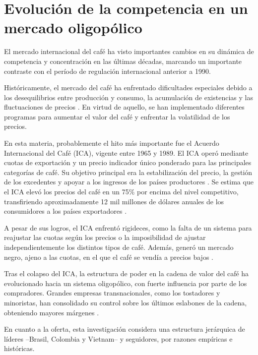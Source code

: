 \section{Evolución de la competencia en un mercado oligopólico}

El mercado internacional del café ha visto importantes cambios en su dinámica de competencia y concentración en las últimas décadas, marcando un importante contraste con el período de regulación internacional anterior a 1990.

Históricamente, el mercado del café ha enfrentado dificultades especiales debido a los desequilibrios entre producción y consumo, la acumulación de existencias y las fluctuaciones de precios \citep{oic2013cincuenta}. En virtud de aquello, se han implementado diferentes programas para aumentar el valor del café y enfrentar la volatilidad de los precios.

En esta materia, probablemente el hito más importante fue el Acuerdo Internacional del Café (ICA), vigente entre 1965 y 1989. El ICA operó mediante cuotas de exportación y un precio indicador único ponderado para las principales categorías de café. Su objetivo principal era la estabilización del precio, la gestión de los excedentes y apoyar a los ingresos de los países productores \citep{oic2013cincuenta}. Se estima que el ICA elevó los precios del café en un 75\% por encima del nivel competitivo, transfiriendo aproximadamente 12 mil millones de dólares anuales de los consumidores a los países exportadores \citep{igami2015market}. 

A pesar de sus logros, el ICA enfrentó rigideces, como la falta de un sistema para reajustar las cuotas según los precios o la imposibilidad de ajustar independientemente los distintos tipos de café. Además, generó un mercado negro, ajeno a las cuotas, en el que el café se vendía a precios bajos \citep{igami2015market}.

Tras el colapso del ICA, la estructura de poder en la cadena de valor del café ha evolucionado hacia un sistema oligopólico, con fuerte influencia por parte de los compradores. Grandes empresas transnacionales, como los tostadores y minoristas, han consolidado su control sobre los últimos eslabones de la cadena, obteniendo mayores márgenes \citep{krivonos2004impact, Zhang2022}.

En cuanto a la oferta, esta investigación considera una estructura jerárquica de líderes --Brasil, Colombia y Vietnam-- y seguidores, por razones empíricas e históricas. 


